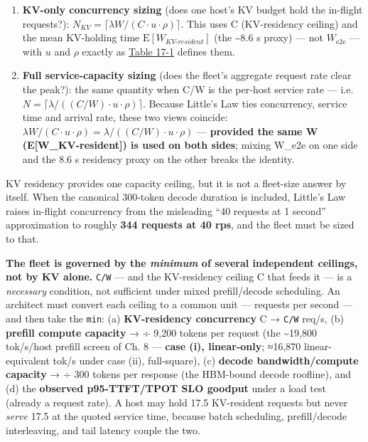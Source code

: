 \begin{enumerate}
\def\labelenumi{\arabic{enumi}.}
\tightlist
\item
  \textbf{KV-only concurrency sizing} (does one host's KV budget hold
  the in-flight requests?):
  \(N_{KV} = \lceil \lambda W / (C \cdot u \cdot \rho) \rceil\). This
  uses C (KV-residency ceiling) and the mean KV-holding time
  \(\mathrm{E}[W_{KV\text{-}resident}]\) (the \textasciitilde8.6 s
  proxy) --- not \(W_{\mathrm{e2e}}\) --- with \(u\) and \(\rho\)
  exactly as \hyperref[tab:17.1]{Table 17-1} defines them.
\item
  \textbf{Full service-capacity sizing} (does the fleet's aggregate
  request rate clear the peak?): the same quantity when C/W is the
  per-host service rate ---
  i.e.~\(N = \lceil \lambda / ((C/W) \cdot u \cdot \rho) \rceil\).
  Because Little's Law ties concurrency, service time and arrival rate,
  these two views coincide:
  \(\lambda W / (C \cdot u \cdot \rho) = \lambda / ((C/W) \cdot u \cdot \rho)\)
  --- \textbf{provided the same W (E{[}W\_KV-resident{]}) is used on
  both sides}; mixing W\_e2e on one side and the 8.6 s residency proxy
  on the other breaks the identity.
\end{enumerate}

KV residency provides one capacity ceiling, but it is not a fleet-size
answer by itself. When the canonical 300-token decode duration is
included, Little's Law raises in-flight concurrency from the misleading
``40 requests at 1 second'' approximation to roughly \textbf{344
requests at 40 rps}, and the fleet must be sized to that.

\textbf{The fleet is governed by the \emph{minimum} of several
independent ceilings, not by KV alone.} \texttt{C/W} --- and the
KV-residency ceiling C that feeds it --- is a \emph{necessary}
condition, not sufficient under mixed prefill/decode scheduling. An
architect must convert each ceiling to a common unit --- requests per
second --- and then take the \texttt{min}: (a) \textbf{KV-residency
concurrency} C → \texttt{C/W} req/s, (b) \textbf{prefill compute
capacity} → ÷ 9,200 tokens per request (the \textasciitilde19,800
tok/s/host prefill screen of Ch. 8 --- \textbf{case (i), linear-only};
≈16,870 linear-equivalent tok/s under case (ii), full-square), (c)
\textbf{decode bandwidth/compute capacity} → ÷ 300 tokens per response
(the HBM-bound decode roofline), and (d) the \textbf{observed
p95-TTFT/TPOT SLO goodput} under a load test (already a request rate). A
host may hold 17.5 KV-resident requests but never \emph{serve} 17.5 at
the quoted service time, because batch scheduling, prefill/decode
interleaving, and tail latency couple the two.

